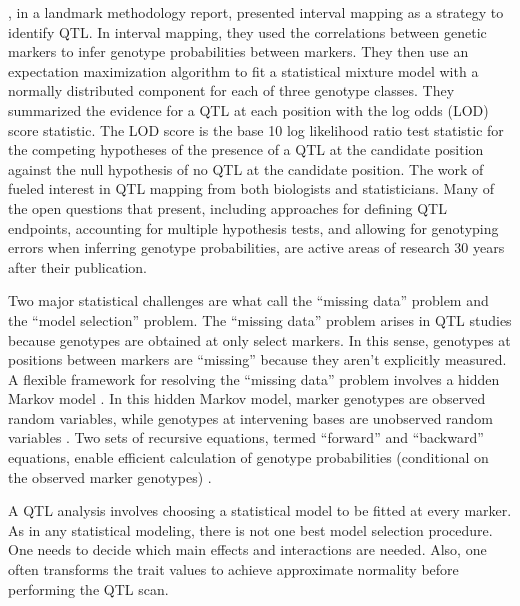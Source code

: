 \documentclass[]{article}\usepackage[]{graphicx}\usepackage[]{color}
\begin{document}
\citet{lander1989mapping}, in a landmark methodology report, presented
interval mapping as a strategy to identify QTL. 
In interval mapping, they used the correlations between genetic markers
to infer genotype probabilities between markers.
They then use an expectation maximization algorithm \citep{dempster1977maximum, lander1987construction}
to fit a statistical mixture model with a normally distributed component for each of three genotype classes. 
They summarized the evidence for a QTL at each position with the log odds (LOD) score statistic.
The LOD score is the base 10 log likelihood ratio test statistic for
the competing hypotheses of the presence of a QTL at the candidate position
against the null hypothesis of no QTL at the candidate position. 
The work of \citet{lander1989mapping} fueled interest in QTL mapping from
both biologists and statisticians.
Many of the open questions that \citet{lander1989mapping} present, including approaches
for defining QTL endpoints, accounting for multiple hypothesis tests, and
allowing for genotyping errors when inferring genotype probabilities,
are active areas of research 30 years after their publication.








Two major statistical challenges are what \citet{broman2009guide} call 
the ``missing data'' problem and the ``model selection'' problem. 
The ``missing data'' problem arises in QTL studies because genotypes are obtained
at only select markers. In this sense, genotypes at positions between
markers are ``missing'' because they aren't explicitly measured.
A flexible framework for resolving the ``missing data'' problem involves a
hidden Markov model \citep{broman2009guide, broman2006use}. 
In this hidden Markov model, marker genotypes are observed random variables, 
while genotypes at intervening bases are unobserved random variables \citep{broman2009guide,broman2006use}. 
Two sets of recursive equations, termed ``forward'' and ``backward'' equations,
enable efficient calculation of genotype probabilities
(conditional on the observed marker genotypes) \citep{baum1970maximization}.


%





A QTL analysis involves choosing a statistical model to be fitted at every marker. 
As in any statistical modeling, there is not one best model selection procedure.
One needs to decide which main effects and interactions are needed.
Also, one often transforms the trait values to achieve approximate normality before performing the QTL scan. 
\end{document}
